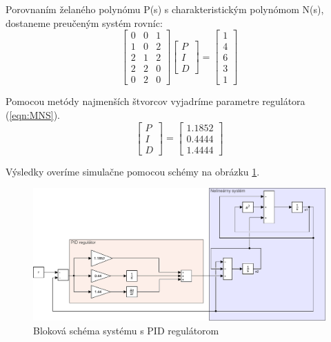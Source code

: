 \documentclass[../main.tex]{subfiles}
\begin{document}
Porovnaním želaného polynómu P(s) s charakteristickým polynómom N(s), dostaneme preučeným systém rovníc:
\begin{equation}
\begin{bmatrix} 0 & 0& 1 \\ 1 & 0  & 2\\2 &1&  2 \\2& 2& 0\\ 0& 2& 0 \end{bmatrix}\begin{bmatrix}P \\I\\ D \end{bmatrix} = \begin{bmatrix} 1 \\4\\6\\3\\1 \end{bmatrix}
 \label{eqn:PP}
\end{equation}	

Pomocou metódy najmenších štvorcov vyjadríme parametre regulátora (\ref{eqn:MNS}).
 \begin{equation}
\begin{bmatrix}P \\I\\ D \end{bmatrix} = \begin{bmatrix} 1.1852 \\0.4444\\1.4444 \end{bmatrix}
 \label{eqn:MNS}
\end{equation}

Výsledky overíme simulačne pomocou schémy na obrázku \ref{fig:PrikladsRiadenimPID}.
	
\begin{figure}[H]
	\begin{center}\includegraphics[scale=0.6]{pid.pdf}\end{center}
	\caption{Bloková schéma systému s PID regulátorom}
	\label{fig:PrikladsRiadenimPID}
\end{figure}
\end{document}

